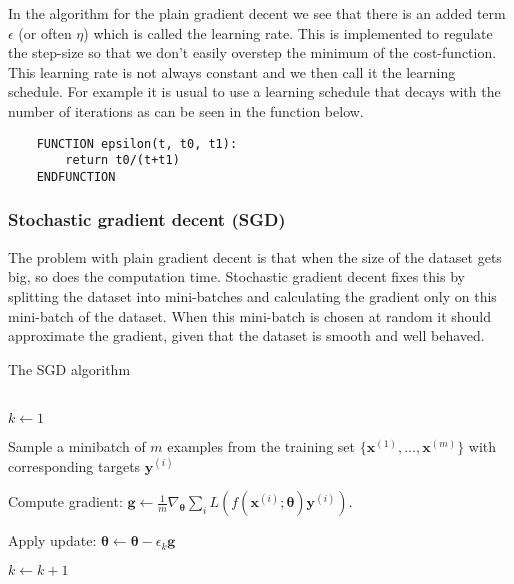 In the algorithm for the plain gradient decent we see that there is an added
term $\epsilon$ (or often $\eta$) which is called the learning rate. This is implemented to regulate
the step-size so that we don't easily overstep the minimum of the
cost-function. This learning rate is not always constant and we then call it
the learning schedule. For example it is usual to use a learning schedule that
decays with the number of iterations as can be seen in the function below.
\begin{lstlisting}
    FUNCTION epsilon(t, t0, t1):
        return t0/(t+t1)
    ENDFUNCTION
\end{lstlisting}


\subsubsection{Stochastic gradient decent (SGD)}
The problem with plain gradient decent is that when the size of the dataset
gets big, so does the computation time. 
Stochastic gradient decent fixes this by splitting the dataset into mini-batches and calculating the gradient only on this
mini-batch of the dataset. When this mini-batch is chosen at random it should approximate
the gradient, given that the dataset is smooth and well behaved.

\begin{algorithm}
\caption{The SGD algorithm}\label{alg:SGD}
\begin{algorithmic}
    \\
    $k\gets1$

     Sample a minibatch of $m$ examples from the training set
        $\{\boldsymbol{x}^{(1)}, ..., \boldsymbol{x}^{(m)}\}$ with corresponding
        targets $\boldsymbol{y}^{(i)}$
        
        Compute gradient: $\boldsymbol{g} \gets
        \frac{1}{m}\nabla_{\boldsymbol\theta}
        \sum_{i}L(f(\boldsymbol{x}^{(i)};\boldsymbol{\theta})\boldsymbol{y}^{(i)})$.
        
        Apply update: $\boldsymbol{\theta} \gets
        \boldsymbol{\theta}-\epsilon_k\boldsymbol{g}$

        $k\gets k+1$
    \EndWhile
\end{algorithmic}
\end{algorithm}


